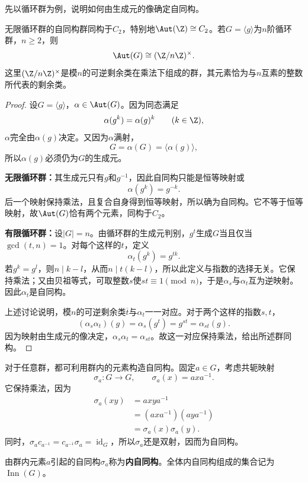 先以循环群为例，说明如何由生成元的像确定自同构。

\begin{proposition}
无限循环群的自同构群同构于$C_2$，特别地$\Aut(\Z)\cong C_2$。若$G=\langle g\rangle$为$n$阶循环群，$n\geq2$，则
\[
\Aut(G)\cong(\Z/n\Z)^\times.
\]
这里$(\Z/n\Z)^\times$是模$n$的可逆剩余类在乘法下组成的群，其元素恰为与$n$互素的整数所代表的剩余类。
\end{proposition}
\begin{proof}
设$G=\langle g\rangle$，$\alpha\in\Aut(G)$。因为同态满足
\[
\alpha(g^k)=\alpha(g)^k\qquad(k\in\Z),
\]
$\alpha$完全由$\alpha(g)$决定。又因为$\alpha$满射，
\[
G=\alpha(G)=\langle\alpha(g)\rangle,
\]
所以$\alpha(g)$必须仍为$G$的生成元。

\textbf{无限循环群：}其生成元只有$g$和$g^{-1}$，因此自同构只能是恒等映射或
\[
\alpha(g^k)=g^{-k}.
\]
后一个映射保持乘法，且复合自身得到恒等映射，所以确为自同构。它不等于恒等映射，故$\Aut(G)$恰有两个元素，同构于$C_2$。

\textbf{有限循环群：}设$|G|=n$。由循环群的生成元判别，$g^t$生成$G$当且仅当$\gcd(t,n)=1$。对每个这样的$t$，定义
\[
\alpha_t(g^k)=g^{tk}.
\]
若$g^k=g^l$，则$n\mid k-l$，从而$n\mid t(k-l)$，所以此定义与指数的选择无关。它保持乘法；又由贝祖等式，可取整数$s$使$st\equiv1\pmod n$，于是$\alpha_s$与$\alpha_t$互为逆映射。因此$\alpha_t$是自同构。

上述讨论说明，模$n$的可逆剩余类$\overline t$与$\alpha_t$一一对应。对于两个这样的指数$s,t$，
\[
(\alpha_s\alpha_t)(g)=\alpha_s(g^t)=g^{st}=\alpha_{st}(g).
\]
因为映射由生成元的像决定，$\alpha_s\alpha_t=\alpha_{st}$。故这一对应保持乘法，给出所述群同构。
\end{proof}

对于任意群，都可利用群内的元素构造自同构。固定$a\in G$，考虑共轭映射
\[
\sigma_a:G\longrightarrow G,\qquad \sigma_a(x)=axa^{-1}.
\]
它保持乘法，因为
\begin{align*}
\sigma_a(xy)&=axya^{-1}\\
&=(axa^{-1})(aya^{-1})\\
&=\sigma_a(x)\sigma_a(y).
\end{align*}
同时，$\sigma_a c_{a^{-1}}=c_{a^{-1}}\sigma_a=\operatorname{id}_G$，所以$\sigma_a$还是双射，因而为自同构。

\begin{definition}
\label{p2:concept:c2-l790}由群内元素$a$引起的自同构$\sigma_a$称为\textbf{内自同构}。全体内自同构组成的集合记为$\operatorname{Inn}(G)$。
\end{definition}


